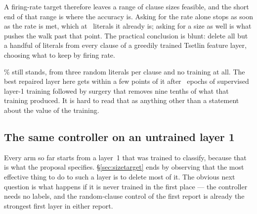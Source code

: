 A firing-rate target therefore leaves a range of clause sizes feasible, and the short end of
that range is where the accuracy is. Asking for the rate alone stops as soon as the rate is
met, which at \calibSizeMctmCalibRTwoZeroTight\ literals it already is; asking for a size as
well is what pushes the walk past that point. The practical conclusion is blunt: delete all
but a handful of literals from every clause of a greedily trained Tsetlin feature layer,
choosing what to keep by firing rate.

 \accMctmRandom{}\% still stands, from
three random literals per clause and no training at all. The best repaired layer here gets
within a few points of it after \epochsRun\ epochs of supervised layer-1 training followed by
surgery that removes nine tenths of what that training produced. It is hard to read that as
anything other than a statement about the value of the training.

\subsection{The same controller on an untrained layer 1}
\label{sec:randcalib}

Every arm so far starts from a layer~1 that was trained to classify, because that is what the
proposal specifies. \S\ref{sec:sizetarget} ends by observing that the most effective thing to
do to such a layer is to delete most of it. The obvious next question is what happens if it is
never trained in the first place --- the controller needs no labels, and the random-clause
control of the first report is already the strongest first layer in either report.

\begin{table}[h]
\centering\small
\caption{The firing-rate sweep run over a \emph{random} layer~1 instead of a trained one.
Columns as in Table~\ref{tab:calib}:  is the requested per-patch rate in percent,
 the median clause size the controller settles on,  and  the
achieved rates. The uncalibrated random layer has three literals per clause and fires on
\fireRandomPre{}\% of pooled positions.}
\label{tab:randcalib}
\end{table}

